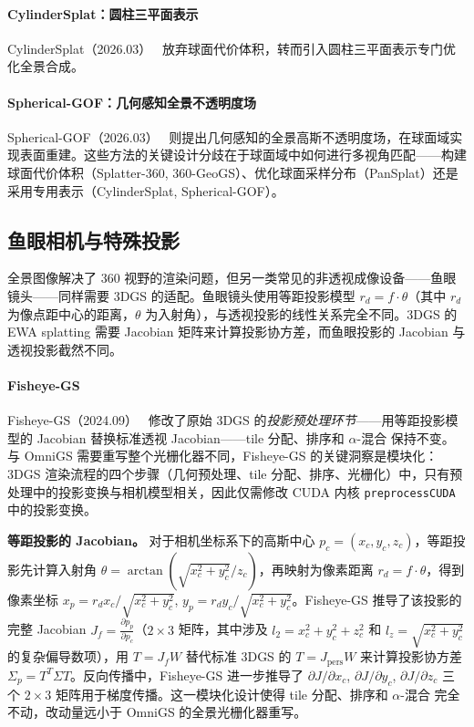 \paragraph{CylinderSplat：圆柱三平面表示}
CylinderSplat（2026.03）~\cite{2603_05882} 放弃球面代价体积，转而引入圆柱三平面表示专门优化全景合成。

\paragraph{Spherical-GOF：几何感知全景不透明度场}
Spherical-GOF（2026.03）~\cite{2603_08503} 则提出几何感知的全景高斯不透明度场，在球面域实现表面重建。这些方法的关键设计分歧在于球面域中如何进行多视角匹配——构建球面代价体积（Splatter-360, 360-GeoGS）、优化球面采样分布（PanSplat）还是采用专用表示（CylinderSplat, Spherical-GOF）。

\subsection{鱼眼相机与特殊投影}

全景图像解决了 360\textdegree{} 视野的渲染问题，但另一类常见的非透视成像设备——鱼眼镜头——同样需要 3DGS 的适配。鱼眼镜头使用等距投影模型 $r_d = f \cdot \theta$（其中 $r_d$ 为像点距中心的距离，$\theta$ 为入射角），与透视投影的线性关系完全不同。3DGS 的 EWA splatting 需要 Jacobian 矩阵来计算投影协方差，而鱼眼投影的 Jacobian 与透视投影截然不同。

\paragraph{Fisheye-GS}
Fisheye-GS（2024.09）~\cite{2409_04751} 修改了原始 3DGS 的\emph{投影预处理环节}——用等距投影模型的 Jacobian 替换标准透视 Jacobian——tile 分配、排序和 $\alpha$-混合 保持不变。与 OmniGS 需要重写整个光栅化器不同，Fisheye-GS 的关键洞察是模块化：3DGS 渲染流程的四个步骤（几何预处理、tile 分配、排序、光栅化）中，只有预处理中的投影变换与相机模型相关，因此仅需修改 CUDA 内核 \texttt{preprocessCUDA} 中的投影变换。

\textbf{等距投影的 Jacobian。}
对于相机坐标系下的高斯中心 $p_c = (x_c, y_c, z_c)$，等距投影先计算入射角 $\theta = \arctan(\sqrt{x_c^2 + y_c^2}/z_c)$，再映射为像素距离 $r_d = f \cdot \theta$，得到像素坐标 $x_p = r_d x_c/\sqrt{x_c^2+y_c^2}$, $y_p = r_d y_c/\sqrt{x_c^2+y_c^2}$。Fisheye-GS 推导了该投影的完整 Jacobian $J_f = \frac{\partial p_p}{\partial p_c}$（$2 \times 3$ 矩阵，其中涉及 $l_2 = x_c^2+y_c^2+z_c^2$ 和 $l_z = \sqrt{x_c^2+y_c^2}$ 的复杂偏导数项），用 $T = J_f W$ 替代标准 3DGS 的 $T = J_{\text{pers}} W$ 来计算投影协方差 $\Sigma_p = T^T \Sigma T$。反向传播中，Fisheye-GS 进一步推导了 $\partial J/\partial x_c$, $\partial J/\partial y_c$, $\partial J/\partial z_c$ 三个 $2 \times 3$ 矩阵用于梯度传播。这一模块化设计使得 tile 分配、排序和 $\alpha$-混合 完全不动，改动量远小于 OmniGS 的全景光栅化器重写。

